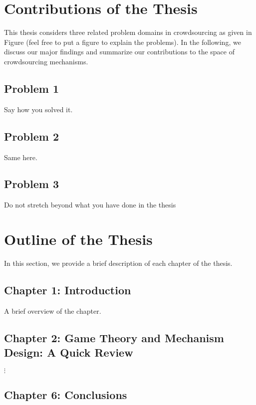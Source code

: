 \documentclass[11pt,psfig]{article}
\begin{document}
\section{Contributions of the Thesis}

This thesis considers three related problem domains in crowdsourcing as given in Figure (feel free to put a figure to explain the problems). In the following, we discuss our major findings and summarize our contributions to the space of crowdsourcing mechanisms.

\subsection{Problem 1}

Say how you solved it.

\subsection{Problem 2}

Same here.

\subsection{Problem 3}

Do not stretch beyond what you have done in the thesis \smiley

\section{Outline of the Thesis}

In this section, we provide a brief description of each chapter of the thesis.

\subsection*{Chapter 1: Introduction}

A brief overview of the chapter.

\subsection*{Chapter 2: Game Theory and Mechanism Design: A Quick Review}

$\vdots$

\subsection*{Chapter 6: Conclusions}



%  
% 
\end{document}
